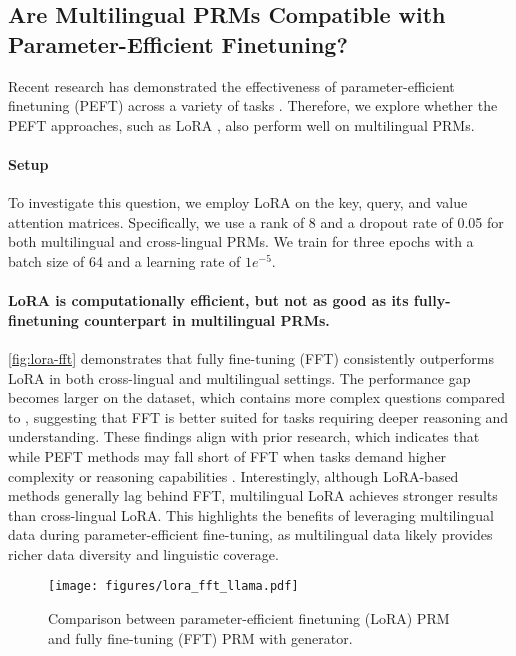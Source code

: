 \subsection{Are Multilingual PRMs Compatible with Parameter-Efficient Finetuning?}
\label{sec:analysis_lora}


Recent research has demonstrated the effectiveness of parameter-efficient finetuning (PEFT) across a variety of tasks \citep{peft1,peft2}. Therefore, we explore whether the PEFT approaches, such as LoRA \citep{lora}, also perform well on multilingual PRMs.

\paragraph{Setup}
To investigate this question, we employ LoRA on the key, query, and value attention matrices. Specifically, we use a rank of 8 and a dropout rate of 0.05 for both multilingual and cross-lingual PRMs. We train for three epochs with a batch size of 64 and a learning rate of $1e^{-5}$.


\paragraph{LoRA is computationally efficient, but not as good as its fully-finetuning counterpart in multilingual PRMs.}


\autoref{fig:lora-fft} demonstrates that fully fine-tuning (FFT) consistently outperforms LoRA in both cross-lingual and multilingual settings. The performance gap becomes larger on the \mathset dataset, which contains more complex questions compared to \mgsmset, suggesting that FFT is better suited for tasks requiring deeper reasoning and understanding. These findings align with prior research, which indicates that while PEFT methods may fall short of FFT when tasks demand higher complexity or reasoning capabilities \citep{lora-fall}. Interestingly, although LoRA-based methods generally lag behind FFT, multilingual LoRA achieves stronger results than cross-lingual LoRA. This highlights the benefits of leveraging multilingual data during parameter-efficient fine-tuning, as multilingual data likely provides richer data diversity and linguistic coverage.


\begin{figure}[t]
    \centering
    \texttt{[image: figures/lora\_fft\_llama.pdf]}
    \caption{Comparison between parameter-efficient finetuning (LoRA) PRM and fully fine-tuning (FFT) PRM with \llama generator.}
    \label{fig:lora-fft}
\end{figure}





